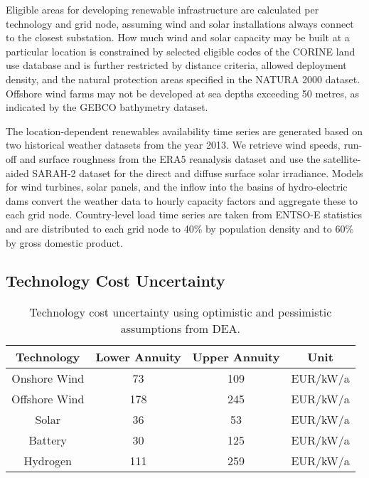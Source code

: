 
Eligible areas for developing renewable infrastructure are calculated
per technology and grid node, assuming wind and solar installations always connect to the closest substation. 
How much wind and solar capacity may be built at a particular location is constrained by selected
eligible codes of the CORINE land use database and is further restricted by distance criteria,
allowed deployment density, and the natural protection areas specified in the NATURA 2000 dataset.
Offshore wind farms may not be developed at sea depths exceeding 50 metres,
as indicated by the GEBCO bathymetry dataset. 


The location-dependent renewables availability time series are generated
based on two historical weather datasets from the year 2013.
We retrieve wind speeds, run-off and surface roughness from the ERA5 reanalysis dataset and
use the satellite-aided SARAH-2 dataset for the direct and diffuse surface solar irradiance.
Models for wind turbines, solar panels, and the inflow into the basins of hydro-electric dams
convert the weather data to hourly capacity factors and aggregate these to each grid node.
Country-level load time series are taken from ENTSO-E statistics and
are distributed to each grid node to 40\% by population density and to 60\% by gross domestic product.

\subsection{Technology Cost Uncertainty}
\label{sec:uncertainty}

\begin{SCtable}
    \begin{small}
        \begin{tabular}{cccc}
            \toprule
            Technology & Lower Annuity & Upper Annuity & Unit  \\ \midrule
            Onshore Wind & 73 & 109 & EUR/kW/a \\
            Offshore Wind & 178 & 245 & EUR/kW/a \\ %
            Solar & 36 & 53 & EUR/kW/a \\
            Battery & 30 & 125 & EUR/kW/a \\
            Hydrogen & 111 & 259 & EUR/kW/a \\ \bottomrule
        \end{tabular}
    \end{small}
    \caption{Technology cost uncertainty using optimistic and pessimistic assumptions from DEA.}
    \label{tab:costuncertainty}
\end{SCtable}   

